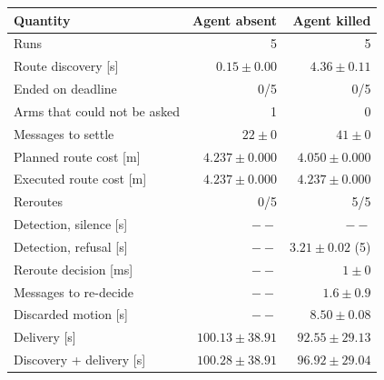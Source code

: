 \begin{tabular}{@{}lrr@{}}
\toprule
        \textbf{Quantity} & \textbf{Agent absent} & \textbf{Agent killed} \\
\midrule
        Runs & 5 & 5 \\
        Route discovery [s] & $0.15 \pm 0.00$ & $4.36 \pm 0.11$ \\
        Ended on deadline & 0/5 & 0/5 \\
        Arms that could not be asked & 1 & 0 \\
        Messages to settle & $22 \pm 0$ & $41 \pm 0$ \\
        Planned route cost [m] & $4.237 \pm 0.000$ & $4.050 \pm 0.000$ \\
        Executed route cost [m] & $4.237 \pm 0.000$ & $4.237 \pm 0.000$ \\
        Reroutes & 0/5 & 5/5 \\
        Detection, silence [s] & $--$ & $--$ \\
        Detection, refusal [s] & $--$ & $3.21 \pm 0.02$ (5) \\
        Reroute decision [ms] & $--$ & $1 \pm 0$ \\
        Messages to re-decide & $--$ & $1.6 \pm 0.9$ \\
        Discarded motion [s] & $--$ & $8.50 \pm 0.08$ \\
        Delivery [s] & $100.13 \pm 38.91$ & $92.55 \pm 29.13$ \\
        Discovery + delivery [s] & $100.28 \pm 38.91$ & $96.92 \pm 29.04$ \\
\bottomrule
\end{tabular}
